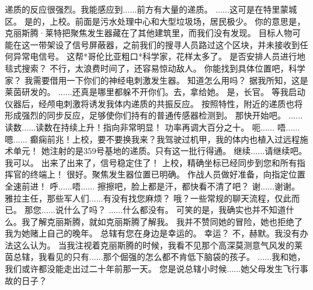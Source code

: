 \documentclass[openany]{book}
\begin{document}
\begin{dialogue}
     递质的反应很强烈。我能感应到......前方有大量的递质。
     ......这可是在特里蒙城区。
     是的，上校。前面是污水处理中心和大型垃圾场，居民极少。
     你的意思是，克丽斯腾·莱特把聚焦发生器藏在了其他建筑里，而我们没有发现。
     目标人物可能在这一带架设了信号屏蔽器，之前我们的搜寻人员路过这个区块，并未接收到任何异常电信号。
     这帮*哥伦比亚粗口*科学家，花样太多了。
     是否安排人员进行地毯式搜索？
     不行，太浪费时间了，还容易惊动敌人。
     你能找到具体位置吧，科学家？
     我需要借用一下你们的神经电刺激发生器。
     知道怎么用吗？
     据我所知，这是莱茵研发的。
     ......还真是哪里都躲不开你们。去，拿给她。
     是，长官。
     等我启动仪器后，经颅电刺激将诱发我体内递质的共振反应。
     按照特性，附近的递质也将形成强烈的同步反应，足够使你们持有的普通传感器检测到。
     那快开始吧。
     ......
     读数......读数在持续上升！指向非常明显！
     功率再调大百分之十。
     呃......
     唔......嗯......
     癫痫前兆！上校，要不要换我来？我驾驶过机甲，我的体内也植入过远程施术单元！
     她注射的是359号基地的递质。只有这一批行得通。
     继续......请继续吧。
     我可以。
     出来了出来了，信号稳定住了！
     上校，精确坐标已经同步到您和所有指挥官的终端上！
     很好。聚焦发生器位置已明确。
     作战人员做好准备，向指定位置全速前进！
     呼......唔......
     擦擦吧，脸上都是汗，都快看不清了吧？
     谢......谢谢。
     雅拉主任，那些军人们......有没有找您麻烦？
     哦？一些常规的聊天流程，仅此而已。
     那您......说什么了吗？
     ......什么都没有。
     可笑的是，我确实也并不知道什么。我了解克丽斯腾，就如克丽斯腾了解我。
     我并不赞同她的冒险，她也拒绝了我为她赌上自己的晚年。
     总辖有您在身边是幸运的。
     幸运？
     不，赫默。我没有办法这么认为。
     当我注视着克丽斯腾的时候，我看不见那个高深莫测意气风发的莱茵总辖，我看见的只有......那个倔强的怎么都不肯低下脑袋的孩子。
     ......我和她，我们或许都没能走出过二十年前那一天。
     您是说总辖小时候......她父母发生飞行事故的日子？

\end{dialogue}
\end{document}

